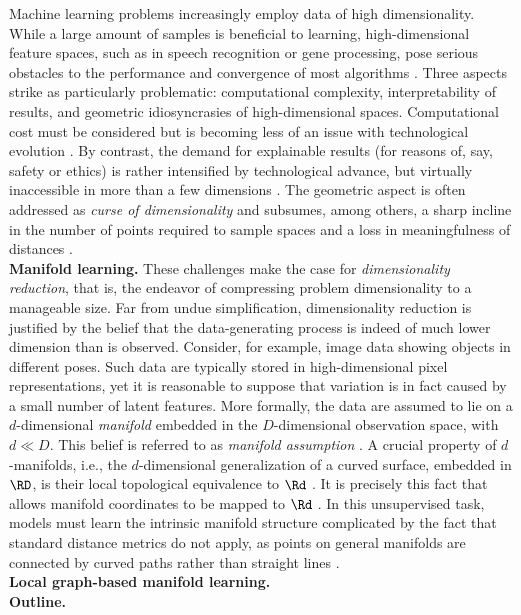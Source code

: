 Machine learning problems increasingly employ data of high dimensionality. 
While a large amount of samples is beneficial to learning, high-dimensional 
feature spaces, such as in speech recognition or gene processing, pose serious 
obstacles to the performance and convergence of most algorithms 
\citep{cayton2005}. 
Three aspects strike as particularly problematic: computational complexity, 
interpretability of results, and geometric idiosyncrasies of high-dimensional 
spaces.
Computational cost must be considered but is becoming less of an issue with 
technological evolution \citep{leistetal2009}.
By contrast, the demand for explainable results (for reasons of, say, safety or
ethics) is rather intensified by technological advance, but virtually 
inaccessible in more than a few dimensions \citep{doshivelezkim2017}. 
The geometric aspect is often addressed as \textit{curse of dimensionality} and 
subsumes, among others, a sharp incline in the number of points required to 
sample spaces and a loss in meaningfulness of distances 
\citep{verleysenfrancois2005}.
\\

\textbf{Manifold learning.}
These challenges make the case for \textit{dimensionality reduction}, that is, 
the endeavor of compressing problem dimensionality to a manageable size. 
Far from undue simplification, dimensionality reduction is justified by the 
belief that the data-generating process is indeed of much lower dimension 
than is observed.
Consider, for example, image data showing objects in different poses.
Such data are typically stored in high-dimensional pixel representations, yet it 
is reasonable to suppose that variation is in fact caused by a small number of 
latent features.
More formally, the data are assumed to lie on a $d$-dimensional 
\textit{manifold} embedded in the $D$-dimensional observation space, with 
$d \ll D$.
This belief is referred to as \textit{manifold assumption} \citep{cayton2005}.
A crucial property of $d$-manifolds, i.e., the $d$-dimensional generalization of
a curved surface, embedded in $\RD$, is their local topological equivalence to 
$\Rd$ \citep{mafu2011}.
It is precisely this fact that allows manifold coordinates to be mapped to 
$\Rd$ \citep{cayton2005}.
In this unsupervised task, models must learn the intrinsic manifold structure 
complicated by the fact that standard distance metrics do not apply, as points 
on general manifolds are connected by curved paths rather than straight lines \citep{mafu2011}.
\\

\textbf{Local graph-based manifold learning.}
\\

\textbf{Outline.}

